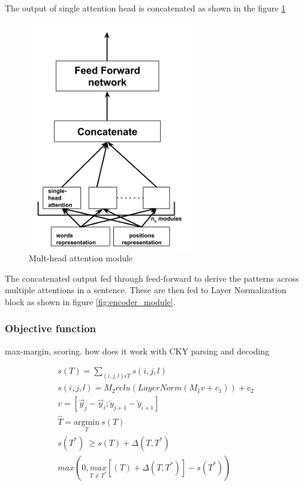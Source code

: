 \documentclass[a4paper, 11pt]{article}
\begin{document}
The output of single attention head is concatenated as shown in the figure \ref{fig:multi_head_attention_module}
\begin{figure}[htpb]
    \centering
    \includegraphics[width=\textwidth,height=10cm,keepaspectratio=true]
    {multi-head-attention.png}
    \caption{
        Mult-head attention module
    }
    \label{fig:multi_head_attention_module}
\end{figure}

The concatenated output fed through feed-forward to derive the patterns across multiple attentions in a sentence. These are then fed to Layer Normalization block as shown in figure \ref{fig:encoder_module}.

\subsubsection{Objective function}
max-margin, scoring. how does it work with CKY parsing and decoding

\begin{align*}
s(T) = \sum_{(i,j,l) \epsilon T}s(i,j,l) \\
s(i,j,l) = M_2relu(LayerNorm(M_1v + c_1)) + c_2 \\
v = [\overrightarrow{y}_j - \overrightarrow{y}_i; \overleftarrow{y}_{j+1} - \overleftarrow{y}_{i+1}] \\
\hat{T} = \underset{T}{\mathrm{argmin}}\ s(T) \\
s(T^*)\ \geq s(T) + \Delta (T,T^*) \\
max\left(0, \underset{T\neq{T^*}}{max}\left[(T) + \Delta(T,T^*)\right] - s(T^*)\right)
\end{align*}
\end{document}
